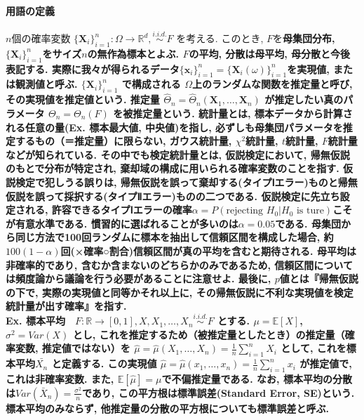 \documentclass[paper=a4paper,fontsize=10pt]{jlreq}
\begin{document}
\paragraph{用語の定義}
$n$個の確率変数 $\{\mathbf{X}_i\}_{i=1}^{n} : \Omega\rightarrow\mathbb{R}^d,  \overset{i.i.d.}{\sim}F$ を考える. このとき, $F$を\rmfamily\mcfamily\bfseries{母集団分布}\mdseries, $\{\mathbf{X}_i\}_{i=1}^{n}$をサイズ$n$の\rmfamily\mcfamily\bfseries{無作為標本}\mdseries とよぶ. $F$の平均, 分散は\rmfamily\mcfamily\bfseries{母平均, 母分散}\mdseries と今後表記する. 実際に我々が得られるデータ$\{\mathbf{x}_i\}_{i=1}^{n}=\{\mathbf{X}_i(\omega)\}_{i=1}^{n}$を\rmfamily\mcfamily\bfseries{実現値}\mdseries, または\rmfamily\mcfamily\bfseries{観測値}\mdseries と呼ぶ. $\{\mathbf{X}_i\}_{i=1}^{n}$ で構成される $\Omega$上のランダムな関数を\rmfamily\mcfamily\bfseries{推定量}\mdseries と呼び, その\rmfamily\mcfamily\bfseries{実現値}\mdseries を\rmfamily\mcfamily\bfseries{推定値}\mdseries という. 推定量 $\hat{\Theta}_n=\hat{\Theta}_n (\mathbf{X}_1, \dots, \mathbf{X}_n)$ が推定したい真のパラメータ $\Theta_n=\Theta_n (F)$ を\rmfamily\mcfamily\bfseries{被推定量}\mdseries という. \rmfamily\mcfamily\bfseries{統計量}\mdseries とは, 標本データから計算される任意の量(Ex. 標本最大値, 中央値)を指し, 必ずしも母集団パラメータを推定するもの（＝推定量）に\rmfamily\mcfamily\bfseries{限らない}\mdseries , ガウス統計量, $\chi^2$統計量, $t$統計量, $F$統計量などが知られている. その中でも\rmfamily\mcfamily\bfseries{検定統計量}\mdseries とは, 仮説検定において, \rmfamily\mcfamily\bfseries{帰無仮説のもとで}\mdseries 分布が特定され, 棄却域の構成に用いられる確率変数のことを指す. 仮説検定で犯しうる誤りは, 帰無仮説を誤って棄却する(タイプⅠエラー)ものと帰無仮説を誤って採択する(タイプⅡエラー)ものの二つである. 仮説検定に先立ち設定される, \rmfamily\mcfamily\bfseries{許容できるタイプⅠエラーの確率}\mdseries $\alpha =P(\text{rejecting } H_0|H_0 \text{ is ture})$こそが\rmfamily\mcfamily\bfseries{有意水準}\mdseries である. 慣習的に選ばれることが多いのは$\alpha=0.05$である. 母集団から同じ方法で100回ランダムに標本を抽出して信頼区間を構成した場合, 約$100(1-\alpha)$回(×確率○割合)信頼区間が真の平均を含むと期待される. 母平均は非確率的であり, 含むか含まないのどちらかのみであるため, 信頼区間については頻度論から議論を行う必要があることに注意せよ. 最後に, $p$値とは\rmfamily\mcfamily\bfseries{『帰無仮説の下で, 実際の実現値と同等かそれ以上に, その帰無仮説に不利な実現値を検定統計量が出す確率』}\mdseries を指す. \\

\rmfamily\mcfamily\bfseries{Ex. 標本平均}\mdseries　$F:\mathbb{R}\rightarrow[0, 1], X, X_1, \dots, X_n \overset{i.i.d.}{\sim}F$ とする. $\mu=\mathbb{E} [X]$, $\sigma^2 = Var(X)$ とし, これを推定するため（被推定量としたとき）の\rmfamily\mcfamily\bfseries{推定量}\mdseries（確率変数, 推定値ではない）を $\hat{\mu}=\hat{\mu}(X_1, \dots, X_n)=\frac{1}{n}\sum_{i = 1}^{n}X_i$ として, これを標本平均$\bar{X_n}$ と定義する. この実現値 $\hat{\mu}=\hat{\mu}(x_1, \dots, x_n)=\frac{1}{n}\sum_{i = 1}^{n}x_i$ が推定値で, これは非確率変数. また, $\mathbb{E}[\hat{\mu}]=\mu$で不偏推定量である. なお, 標本平均の分散は$Var(\bar{X}_n)=\frac{\sigma^2}{n}$であり, この平方根は標準誤差(Standard Error, SE)という. 標本平均のみならず, 他推定量の分散の平方根についても標準誤差と呼ぶ.\\
\end{document}
